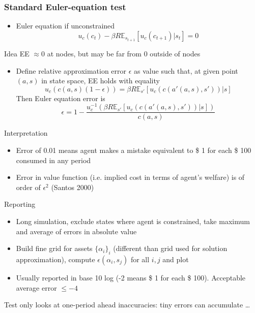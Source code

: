 \documentclass{beamer}
\begin{document}
\begin{frame}
  \frametitle{Standard Euler-equation test}
  \begin{itemize}
    \item   Euler equation if unconstrained
      \begin{equation}\tag{EE}
        u_c(c_t) - \beta R \mathbb{E}_{s_{t+1}}[u_c(c_{t+1})|s_t] = 0
      \end{equation}
    \end{itemize}
    \begin{block}{Idea}
      EE $\approx 0$ at nodes, but may be far from 0 outside of nodes
    \end{block}
    \begin{itemize}
      \item   Define relative approximation error $\epsilon$ as value such that, at given point $(a,s)$ in state space, EE holds with equality
        \begin{equation*}
          u_c(c(a,s)(1-\epsilon)) = \beta R \mathbb{E}_{s'}[u_c(c(a'(a,s),s'))|s]
        \end{equation*}
        Then Euler equation error is
        \begin{equation*}
          \epsilon = 1-\frac{u_c^{-1}\left(\beta R \mathbb{E}_{s'}[u_c(c(a'(a,s),s'))|s]\right)}{c(a,s)}
        \end{equation*}
  \end{itemize}
\end{frame}

\begin{frame}
  \begin{block}{Interpretation}
  \begin{itemize}
    \item Error of 0.01 means agent makes a mistake equivalent to \$ 1 for each \$ 100 consumed in any period
    \item Error in value function (i.e. implied cost in terms of agent's welfare) is of order of $\epsilon^2$ (Santos 2000)
  \end{itemize}
  \end{block}

  \begin{block}{Reporting}
    \begin{itemize}
      \item Long simulation, exclude states where agent is constrained, take maximum and average of errors in absolute value
      \item Build fine grid for assets $\{\alpha_i\}_i$ (different than grid used for solution approximation), compute $\epsilon(\alpha_i,s_j)$ for all $i, j$ and plot
      \item Usually reported in base 10 log (-2 means \$ 1 for each \$ 100). Acceptable average error $\leq -4$
    \end{itemize}
  \end{block}
  \medskip
  Test only looks at one-period ahead inaccuracies: tiny errors can accumulate \ldots
\end{frame}
\end{document}
